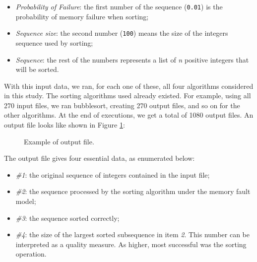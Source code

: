 \begin{itemize}
    \item \textit{Probability of Failure}: the first number of the sequence (\texttt{0.01}) is the probability of memory failure when sorting;
    \item \textit{Sequence size}: the second number (\texttt{100}) means the size of the integers sequence used by sorting;
    \item \textit{Sequence}: the rest of the numbers represents a list of \textit{n} positive integers that will be sorted.
\end{itemize}

With this input data, we ran, for each one of these, all four algorithms considered in this study. The sorting algorithms used already existed. For example, using all 270 input files, we ran bubblesort, creating 270 output files, and so on for the other algorithms. At the end of executions, we get a total of 1080 output files. An output file looks like shown in Figure \ref{fig-output-file-example}:

    
\begin{figure}[H]
    \centering
    \fbox{
    \theverbbox
    }
    \caption{Example of output file.}
    \label{fig-output-file-example}
\end{figure}

The output file gives four essential data, as enumerated below:
\begin{itemize}
    \item \textit{\#1}: the original sequence of integers contained in the input file;
    \item \textit{\#2}: the sequence processed by the sorting algorithm under the memory fault model;
    \item \textit{\#3}: the sequence sorted correctly;
    \item \textit{\#4}: the size of the largest sorted subsequence in item \textit{2}. This number can be interpreted as a quality measure. As higher, most successful was the sorting operation.
\end{itemize}

